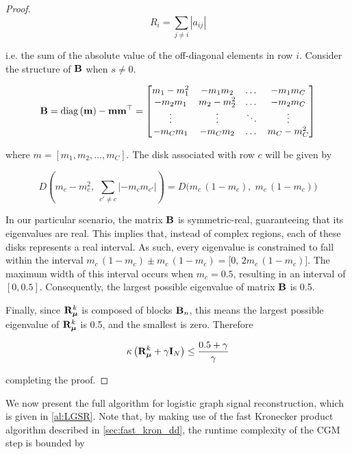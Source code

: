 \begin{proof}
    \begin{equation*}
        R_i = \sum_{j \neq i} |a_{ij}|
    \end{equation*}
    
    i.e. the sum of the absolute value of the off-diagonal elements in row $i$. Consider the structure of $\mathbf{B}$ when $s \neq 0$. 

    \begin{equation*}
        \mathbf{B} = \text{\textup{diag}}\left(\mathbf{m}\right) - \mathbf{m} \mathbf{m}^\top = \begin{bmatrix}
            m_1 - m_1^2 & -m_1 m_2 & \dots & - m_1 m_C \\
            - m_2 m_1 & m_2 - m_2^2 & \dots & -m_2 m_C \\
            \vdots & \vdots & \ddots & \vdots \\
            -m_C m_1 & -m_C m_2 & \dots &m_C- m_C^2
        \end{bmatrix}
    \end{equation*}
    
    where $m = [m_1, m_2, ..., m_C]$. The disk associated with row $c$ will be given by

    $$
    D\left(m_c - m_c^2, \; \sum_{c' \neq c} |-m_c m_{c'}|\right) = D\Big(m_c\,(1 - m_c), \; m_c\,(1 - m_c)\Big)
    $$
    
    In our particular scenario, the matrix $\mathbf{B}$ is symmetric-real, guaranteeing that its eigenvalues are real. This implies that, instead of complex regions, each of these disks represents a real interval. As such, every eigenvalue is constrained to fall within the interval $m_c\,(1 - m_c) \pm m_c\,(1 - m_c) = \big[0, \, 2 m_c\,(1 - m_c)\big]$. The maximum width of this interval occurs when $m_c = 0.5$, resulting in an interval of $[0, 0.5]$. Consequently, the largest possible eigenvalue of matrix $\mathbf{B}$ is 0.5.

    Finally, since $\mathbf{R}_{\boldsymbol{\mu}}^k$ is composed of blocks $\mathbf{B}_n$, this means the largest possible eigenvalue of $\mathbf{R}_{\boldsymbol{\mu}}^k$ is 0.5, and the smallest is zero. Therefore

    \begin{equation*}
        \kappa\left( \mathbf{R}_{\boldsymbol{\mu}}^k + \gamma \mathbf{I}_N\right) \leq \frac{0.5 + \gamma}{\gamma}
    \end{equation*}

    completing the proof.

\end{proof}

We now present the full algorithm for logistic graph signal reconstruction, which is given in \cref{al:LGSR}. Note that, by making use of the fast Kronecker product algorithm described in \cref{sec:fast_kron_dd}, the runtime complexity of the CGM step is bounded by 

